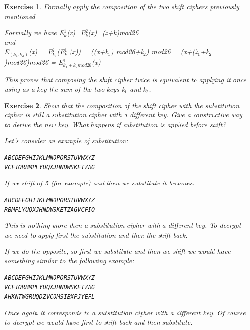 \documentclass[a4paper, 12pt]{report}
\newtheorem{exercise}{\textbf{Exercise}}
\begin{document}
\begin{exercise}
	Formally apply the composition of the two shift ciphers previously mentioned.
	
	Formally we have E$_k^1$(x)=E$_k^2$(x)=(x+k)mod26\\
	and\\
	E$_{(k_1,k_2)}$(x) = E$_{k_2}^2$(E$_{k_1}^1$(x)) = ((x+k$_1$) mod26+k$_2$) mod26 = (x+(k$_1$+k$_2$)mod26)mod26 = E$_{k_1+k_2mod26}^1$(x)
	
	This proves that composing the shift cipher twice is equivalent to applying it once using as a key the sum of the two keys k$_1$ and k$_2$.
\end{exercise}

\begin{exercise}
	Show that the composition of the shift cipher with the substitution cipher is still a substitution cipher with a different key. Give a constructive way to derive the new key. What happens if substitution is applied before shift? 
	
	Let's consider an example of substitution:
	\begin{center}
		\texttt{ABCDEFGHIJKLMNOPQRSTUVWXYZ}\\
		\texttt{VCFIORBMPLYUQXJHNDWSKETZAG}
	\end{center}
	If we shift of 5 (for example) and then we substitute it becomes:
		\begin{center}
		\texttt{ABCDEFGHIJKLMNOPQRSTUVWXYZ}\\
		\texttt{RBMPLYUQXJHNDWSKETZAGVCFIO}
	\end{center}
	This is nothing more then a substitution cipher with a different key. To decrypt we need to apply first the substitution and then the shift back.
	
	If we do the opposite, so first we substitute and then we shift we would have something similar to the following example:
		\begin{center}
		\texttt{ABCDEFGHIJKLMNOPQRSTUVWXYZ}\\
		\texttt{VCFIORBMPLYUQXJHNDWSKETZAG}\\
		\texttt{AHKNTWGRUQDZVCOMSIBXPJYEFL}
	\end{center}
	Once again it corresponds to a substitution cipher with a different key. Of course to decrypt we would have first to shift back and then substitute.
\end{exercise}
\end{document}
